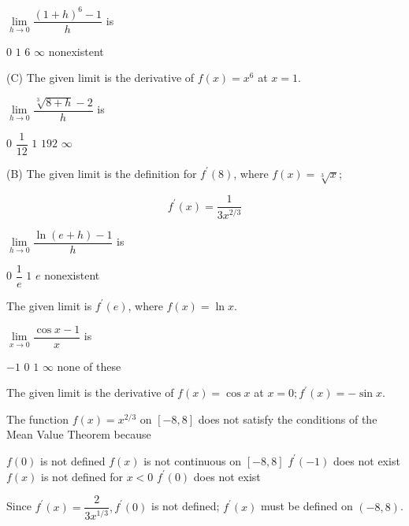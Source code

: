 \question
$\lim\limits_{h \to 0} \dfrac{(1+h)^{6}-1}{h}$ is
\begin{choices}
  \choice $0$
  \choice $1$
  \CorrectChoice $6$
  \choice $\infty$
  \choice nonexistent
\end{choices}
\begin{solution}
(C) The given limit is the derivative of $f(x)=x^{6}$ at $x=1$.
\end{solution}


\newpage


\question
$\lim\limits_{h \to 0} \dfrac{\sqrt[3]{8+h}-2}{h}$ is
\begin{choices}
  \choice $0$
  \CorrectChoice $\dfrac{1}{12}$
  \choice $1$
  \choice $192$
  \choice $\infty$
\end{choices}
\begin{solution}
(B) The given limit is the definition for $f^{\prime}(8)$, where $f(x)=\sqrt[3]{x}$;

\[
f^{\prime}(x)=\dfrac{1}{3 x^{2 / 3}}
\]


\end{solution}

\question
$\lim\limits_{h \to 0} \dfrac{\ln (e+h)-1}{h}$ is
\begin{choices}
  \choice $0$
  \CorrectChoice $\dfrac{1}{e}$
  \choice $1$
  \choice $e$
  \choice nonexistent
\end{choices}
\begin{solution}
The given limit is $f^{\prime}(e)$, where $f(x)=\ln x$.
\end{solution}

\question
$\lim\limits_{x \to 0} \dfrac{\cos x-1}{x}$ is
\begin{choices}
  \choice $-1$
  \CorrectChoice $0$
  \choice $1$
  \choice $\infty$
  \choice none of these
\end{choices}
\begin{solution}
The given limit is the derivative of $f(x)=\cos x$ at $x=0 ; f^{\prime}(x)=-\sin x$.
\end{solution}


\newpage


\question
The function $f(x)=x^{2 / 3}$ on $[-8,8]$ does not satisfy the conditions of the Mean Value Theorem because
\begin{choices}
  \choice $f(0)$ is not defined
  \choice $f(x)$ is not continuous on $[-8,8]$
  \choice $f^{\prime}(-1)$ does not exist
  \choice $f(x)$ is not defined for $x<0$
  \CorrectChoice $f^{\prime}(0)$ does not exist
\end{choices}
\begin{solution}
Since $f^{\prime}(x)=\dfrac{2}{3 x^{1 / 3}}, f^{\prime}(0)$ is not defined; $f^{\prime}(x)$ must be defined on $(-8,8)$.
\end{solution}

